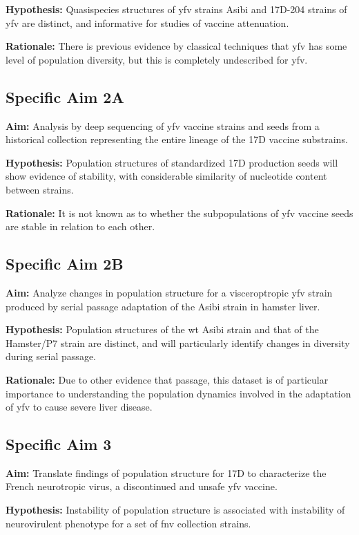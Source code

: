 \textbf{Hypothesis:} Quasispecies structures of \gls{yfv} strains Asibi and 17D-204 strains of \gls{yfv} are distinct, and informative for studies of vaccine attenuation.

\textbf{Rationale:} There is previous evidence by classical techniques that \gls{yfv} has some level of population diversity, but this is completely undescribed for \gls{yfv}.

\subsection{Specific Aim 2A}
\textbf{Aim:} Analysis by deep sequencing of \gls{yfv} vaccine strains and seeds from a historical collection representing the entire lineage of the 17D vaccine substrains.

\textbf{Hypothesis:} Population structures of standardized 17D production seeds will show evidence of stability, with considerable similarity of nucleotide content between strains.

\textbf{Rationale:} It is not known as to whether the subpopulations of \gls{yfv} vaccine seeds are stable in relation to each other.

\subsection{Specific Aim 2B}
\textbf{Aim:} Analyze changes in population structure for a visceroptropic \gls{yfv} strain produced by serial passage adaptation of the Asibi strain in hamster liver.

\textbf{Hypothesis:} Population structures of the \gls{wt} Asibi strain and that of the Hamster/P7 strain are distinct, and will particularly identify changes in diversity during serial passage.

\textbf{Rationale:} Due to other evidence that passage, this dataset is of particular importance to understanding the population dynamics involved in the adaptation of \gls{yfv} to cause severe liver disease.

\subsection{Specific Aim 3} 
\textbf{Aim:} Translate findings of population structure for 17D to characterize the French neurotropic virus, a discontinued and unsafe \gls{yfv} vaccine.

\textbf{Hypothesis:} Instability of population structure is associated with instability of neurovirulent phenotype for a set of \gls{fnv} collection strains.

